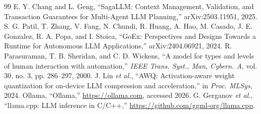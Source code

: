 \documentclass[conference]{IEEEtran}
\begin{document}
\begin{thebibliography}{99}
 E. Y. Chang and L. Geng, ``SagaLLM: Context Management, Validation, and Transaction Guarantees for Multi-Agent LLM Planning,'' arXiv:2503.11951, 2025.
 S. G. Patil, T. Zhang, V. Fang, N. Chundi, R. Huang, A. Hao, M. Casado, J. E. Gonzalez, R. A. Popa, and I. Stoica, ``GoEx: Perspectives and Designs Towards a Runtime for Autonomous LLM Applications,'' arXiv:2404.06921, 2024.
 R. Parasuraman, T. B. Sheridan, and C. D. Wickens, ``A model for types and levels of human interaction with automation,'' \emph{IEEE Trans. Syst., Man, Cybern. A}, vol. 30, no. 3, pp. 286--297, 2000.
 J. Lin \emph{et al.}, ``AWQ: Activation-aware weight quantization for on-device LLM compression and acceleration,'' in \emph{Proc. MLSys}, 2024.
 Ollama, ``Ollama,'' \url{https://ollama.com}, accessed 2026.
 G. Gerganov \emph{et al.}, ``llama.cpp: LLM inference in C/C++,'' \url{https://github.com/ggml-org/llama.cpp}.
\end{thebibliography}
\end{document}
